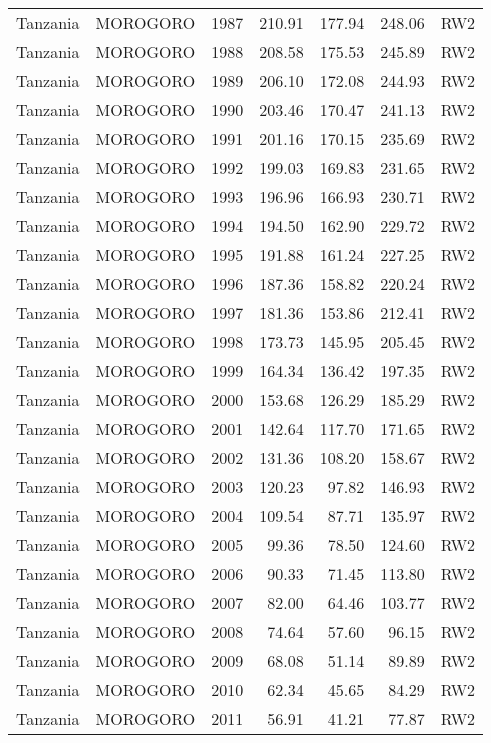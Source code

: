 \begin{longtable}{lllrrrl}
  Tanzania & MOROGORO & 1987 & 210.91 & 177.94 & 248.06 & RW2 \\ 
  Tanzania & MOROGORO & 1988 & 208.58 & 175.53 & 245.89 & RW2 \\ 
  Tanzania & MOROGORO & 1989 & 206.10 & 172.08 & 244.93 & RW2 \\ 
  Tanzania & MOROGORO & 1990 & 203.46 & 170.47 & 241.13 & RW2 \\ 
  Tanzania & MOROGORO & 1991 & 201.16 & 170.15 & 235.69 & RW2 \\ 
  Tanzania & MOROGORO & 1992 & 199.03 & 169.83 & 231.65 & RW2 \\ 
  Tanzania & MOROGORO & 1993 & 196.96 & 166.93 & 230.71 & RW2 \\ 
  Tanzania & MOROGORO & 1994 & 194.50 & 162.90 & 229.72 & RW2 \\ 
  Tanzania & MOROGORO & 1995 & 191.88 & 161.24 & 227.25 & RW2 \\ 
  Tanzania & MOROGORO & 1996 & 187.36 & 158.82 & 220.24 & RW2 \\ 
  Tanzania & MOROGORO & 1997 & 181.36 & 153.86 & 212.41 & RW2 \\ 
  Tanzania & MOROGORO & 1998 & 173.73 & 145.95 & 205.45 & RW2 \\ 
  Tanzania & MOROGORO & 1999 & 164.34 & 136.42 & 197.35 & RW2 \\ 
  Tanzania & MOROGORO & 2000 & 153.68 & 126.29 & 185.29 & RW2 \\ 
  Tanzania & MOROGORO & 2001 & 142.64 & 117.70 & 171.65 & RW2 \\ 
  Tanzania & MOROGORO & 2002 & 131.36 & 108.20 & 158.67 & RW2 \\ 
  Tanzania & MOROGORO & 2003 & 120.23 & 97.82 & 146.93 & RW2 \\ 
  Tanzania & MOROGORO & 2004 & 109.54 & 87.71 & 135.97 & RW2 \\ 
  Tanzania & MOROGORO & 2005 & 99.36 & 78.50 & 124.60 & RW2 \\ 
  Tanzania & MOROGORO & 2006 & 90.33 & 71.45 & 113.80 & RW2 \\ 
  Tanzania & MOROGORO & 2007 & 82.00 & 64.46 & 103.77 & RW2 \\ 
  Tanzania & MOROGORO & 2008 & 74.64 & 57.60 & 96.15 & RW2 \\ 
  Tanzania & MOROGORO & 2009 & 68.08 & 51.14 & 89.89 & RW2 \\ 
  Tanzania & MOROGORO & 2010 & 62.34 & 45.65 & 84.29 & RW2 \\ 
  Tanzania & MOROGORO & 2011 & 56.91 & 41.21 & 77.87 & RW2 \\ 

\end{longtable}
